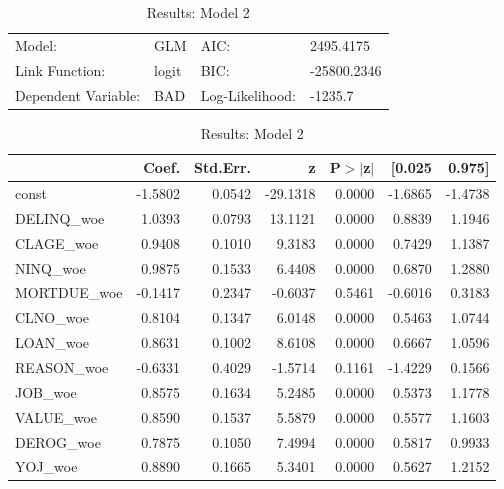 \begin{appendices}
\begin{table}[H]
\renewcommand{\arraystretch}{1.25}
\begin{center}
\begin{tabular}{llll}
\hline
Model:              & GLM              & AIC:            & 2495.4175    \\
Link Function:      & logit            & BIC:            & -25800.2346  \\
Dependent Variable: & BAD              & Log-Likelihood: & -1235.7      \\
\hline
\end{tabular}
\end{center}
\begin{center}
\begin{tabular}{lrrrrrr}
\hline
             &  Coef.  & Std.Err. &    z     & P$> |$z$|$ &  [0.025 &  0.975]  \\
\hline
\hline
const        & -1.5802 &   0.0542 & -29.1318 &      0.0000 & -1.6865 & -1.4738  \\
DELINQ\_woe  &  1.0393 &   0.0793 &  13.1121 &      0.0000 &  0.8839 &  1.1946  \\
CLAGE\_woe   &  0.9408 &   0.1010 &   9.3183 &      0.0000 &  0.7429 &  1.1387  \\
NINQ\_woe    &  0.9875 &   0.1533 &   6.4408 &      0.0000 &  0.6870 &  1.2880  \\
MORTDUE\_woe & -0.1417 &   0.2347 &  -0.6037 &      0.5461 & -0.6016 &  0.3183  \\
CLNO\_woe    &  0.8104 &   0.1347 &   6.0148 &      0.0000 &  0.5463 &  1.0744  \\
LOAN\_woe    &  0.8631 &   0.1002 &   8.6108 &      0.0000 &  0.6667 &  1.0596  \\
REASON\_woe  & -0.6331 &   0.4029 &  -1.5714 &      0.1161 & -1.4229 &  0.1566  \\
JOB\_woe     &  0.8575 &   0.1634 &   5.2485 &      0.0000 &  0.5373 &  1.1778  \\
VALUE\_woe   &  0.8590 &   0.1537 &   5.5879 &      0.0000 &  0.5577 &  1.1603  \\
DEROG\_woe   &  0.7875 &   0.1050 &   7.4994 &      0.0000 &  0.5817 &  0.9933  \\
YOJ\_woe     &  0.8890 &   0.1665 &   5.3401 &      0.0000 &  0.5627 &  1.2152  \\
\hline
\end{tabular}
\end{center}
\caption{Results: Model 2 \label{table:results_2}}
\end{table}


\end{appendices}
